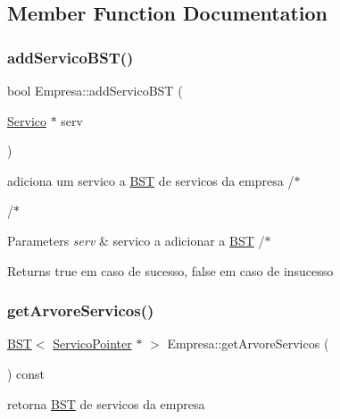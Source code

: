 \subsection{Member Function Documentation}
\mbox{\label{class_empresa_a7f40b739ea88afe971c3a52d520d708a}} 
\subsubsection{\texorpdfstring{add\+Servico\+B\+S\+T()}{addServicoBST()}}
{\footnotesize\ttfamily bool Empresa\+::add\+Servico\+B\+ST (\begin{DoxyParamCaption}\item[{\hyperlink{class_servico}{Servico} $\ast$}]{serv }\end{DoxyParamCaption})}



adiciona um servico a \hyperlink{class_b_s_t}{B\+ST} de servicos da empresa /$\ast$ 

/$\ast$ 
\begin{DoxyParams}{Parameters}
{\em serv} & servico a adicionar a \hyperlink{class_b_s_t}{B\+ST} /$\ast$ \\
\hline
\end{DoxyParams}
\begin{DoxyReturn}{Returns}
true em caso de sucesso, false em caso de insucesso 
\end{DoxyReturn}
\mbox{\label{class_empresa_a1515dc722b64eab75b9d7a37ddd7863b}} 
\subsubsection{\texorpdfstring{get\+Arvore\+Servicos()}{getArvoreServicos()}}
{\footnotesize\ttfamily \hyperlink{class_b_s_t}{B\+ST}$<$ \hyperlink{class_servico_pointer}{Servico\+Pointer} $\ast$ $>$ Empresa\+::get\+Arvore\+Servicos (\begin{DoxyParamCaption}{ }\end{DoxyParamCaption}) const}



retorna \hyperlink{class_b_s_t}{B\+ST} de servicos da empresa 

